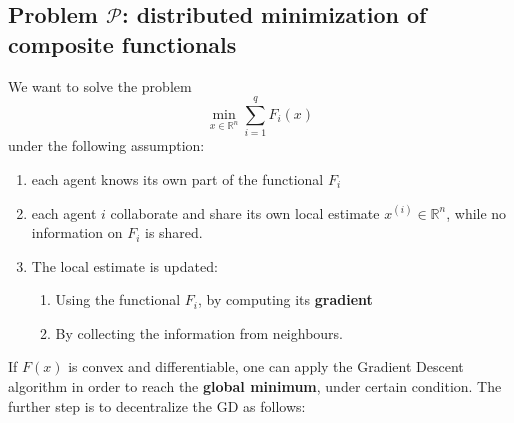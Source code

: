 \subsection{Problem $\mathcal{P}$: distributed minimization of composite functionals}
We want to solve the problem
\begin{equation*}
    \min_{x\in\mathbb{R}^n}  \sum_{i=1}^q F_i(x) 
\end{equation*}
under the following assumption: 
\begin{enumerate}
    \item each agent knows its own part of the functional $F_i$
    \item each agent $i$ collaborate and share its own local estimate $x^{(i)}\in\mathbb{R}^n$, while no information on $F_i$ is shared.
    \item The local estimate is updated:
    \begin{enumerate}
        \item Using the functional $F_i$, by computing its \textbf{gradient}
        \item By collecting the information from neighbours.
    \end{enumerate}
\end{enumerate}

\noindent
If $F(x)$ is convex and differentiable, one can apply the Gradient Descent algorithm in order to reach the \textbf{global minimum}, under certain condition. The further step is to decentralize the GD as follows:\\

